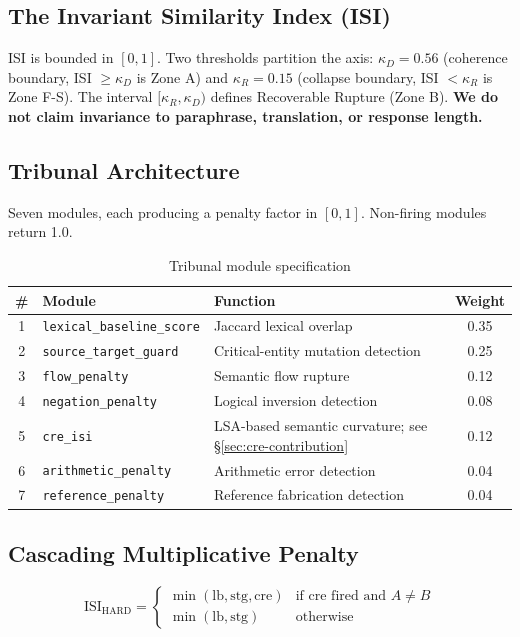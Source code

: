 \documentclass[11pt,a4paper]{article}
\begin{document}
\subsection{The Invariant Similarity Index (ISI)}
ISI is bounded in $[0, 1]$. Two thresholds partition the axis: $\kappa_D = 0.56$ (coherence boundary, ISI $\geq \kappa_D$ is Zone A) and $\kappa_R = 0.15$ (collapse boundary, ISI $< \kappa_R$ is Zone F-S). The interval $[\kappa_R, \kappa_D)$ defines Recoverable Rupture (Zone B). \textbf{We do not claim invariance to paraphrase, translation, or response length.}

\subsection{Tribunal Architecture}
Seven modules, each producing a penalty factor in $[0,1]$. Non-firing modules return 1.0.

\begin{table}[H]
\centering
\caption{Tribunal module specification}
\label{tab:modules}
\begin{tabular}{@{}clp{7cm}c@{}}
\toprule
\# & Module & Function & Weight \\
\midrule
1 & \texttt{lexical\_baseline\_score} & Jaccard lexical overlap & 0.35 \\
2 & \texttt{source\_target\_guard} & Critical-entity mutation detection & 0.25 \\
3 & \texttt{flow\_penalty} & Semantic flow rupture & 0.12 \\
4 & \texttt{negation\_penalty} & Logical inversion detection & 0.08 \\
5 & \texttt{cre\_isi} & LSA-based semantic curvature; see \S\ref{sec:cre-contribution} & 0.12 \\
6 & \texttt{arithmetic\_penalty} & Arithmetic error detection & 0.04 \\
7 & \texttt{reference\_penalty} & Reference fabrication detection & 0.04 \\
\bottomrule
\end{tabular}
\end{table}

\subsection{Cascading Multiplicative Penalty}
\label{sec:multiplicative}

\begin{equation}
\text{ISI}_{\text{HARD}} =
\begin{cases}
\min(\text{lb}, \text{stg}, \text{cre}) & \text{if cre fired and } A \neq B \\
\min(\text{lb}, \text{stg}) & \text{otherwise}
\end{cases}
\end{equation}
\end{document}
